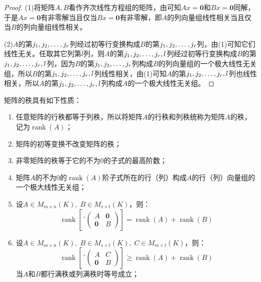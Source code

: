 \begin{proof}
	(1)将矩阵$A,B$看作齐次线性方程组的矩阵，由可知$Ax=\mathbf{0}$和$Bx=\mathbf{0}$同解，于是$Ax=\mathbf{0}$有非零解当且仅当$Bx=\mathbf{0}$有非零解，即$A$的列向量组线性相关当且仅当$B$的列向量组线性相关。\par
	(2)$A$的第$j_1, j_2, \dots, j_{r}$列经过初等行变换构成$B$的第$j_1, j_2, \dots, j_{r}$列，由(1)可知它们线性无关。任取其它列第$l$列，则$A$的第$j_1, j_2, \dots, j_{r},l$列经过初等行变换构成$B$的第$j_1, j_2, \dots, j_{r},l$列，因为$B$的第$j_1, j_2, \dots, j_{r}$列构成$B$的列向量组的一个极大线性无关组，所以$B$的第$j_1, j_2, \dots, j_{r},l$列线性相关，由(1)可知$A$的第$j_1, j_2, \dots, j_{r},l$列也线性相关，所以$A$的第$j_1, j_2, \dots, j_{r},l$列构成$A$的一个极大线性无关组。
\end{proof}
\begin{property}\label{prop:MatrixRank}
	矩阵的秩具有如下性质：
	\begin{enumerate}
		\item 任意矩阵的行秩都等于列秩，所以将矩阵$A$的行秩和列秩统称为矩阵$A$的秩，记为$\operatorname{rank}(A)$；
		\item 矩阵的初等变换不改变矩阵的秩；
		\item 非零矩阵的秩等于它的不为$0$的子式的最高阶数；
		\item 矩阵$A$的不为$0$的$\operatorname{rank}(A)$阶子式所在的行（列）构成$A$的行（列）向量组的一个极大线性无关组；
		\item 设$A\in M_{m\times n}(K),\;B\in M_{s\times t}(K)$，则：
		\begin{equation*}
			\operatorname{rank}\left[
			´\begin{pmatrix}
				A & \mathbf{0} \\
				\mathbf{0} & B
			\end{pmatrix}
			\right]=\operatorname{rank}(A)+\operatorname{rank}(B)
		\end{equation*}
		\item 设$A\in M_{m\times n}(K),\;B\in M_{s\times t}(K),\;C\in M_{m\times t}(K)$，则：
		\begin{equation*}
			\operatorname{rank}\left[
			´\begin{pmatrix}
				A & C\\
				\mathbf{0} & B
			\end{pmatrix}
			\right]\geqslant\operatorname{rank}(A)+\operatorname{rank}(B)
		\end{equation*}
		当$A$和$B$都行满秩或列满秩时等号成立；
	\end{enumerate}
\end{property}
